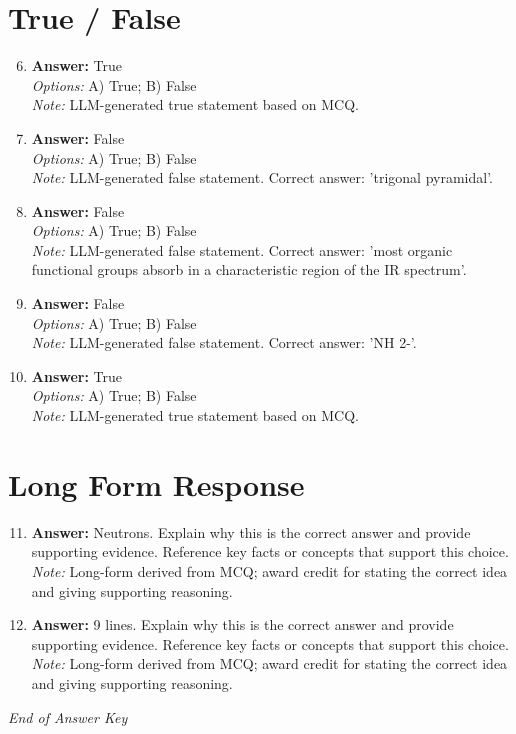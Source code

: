 \documentclass[12pt]{article}
\begin{document}
\section*{True / False}
\begin{enumerate}[label=\arabic*.]
\setcounter{enumi}{5}
\item \textbf{Answer:} True
\\ \textit{Options:} A) True; B) False
\\ \textit{Note:} LLM-generated true statement based on MCQ.
\item \textbf{Answer:} False
\\ \textit{Options:} A) True; B) False
\\ \textit{Note:} LLM-generated false statement. Correct answer: 'trigonal pyramidal'.
\item \textbf{Answer:} False
\\ \textit{Options:} A) True; B) False
\\ \textit{Note:} LLM-generated false statement. Correct answer: 'most organic functional groups absorb in a characteristic region of the IR spectrum'.
\item \textbf{Answer:} False
\\ \textit{Options:} A) True; B) False
\\ \textit{Note:} LLM-generated false statement. Correct answer: 'NH 2-'.
\item \textbf{Answer:} True
\\ \textit{Options:} A) True; B) False
\\ \textit{Note:} LLM-generated true statement based on MCQ.
\end{enumerate}

\section*{Long Form Response}
\begin{enumerate}[label=\arabic*.]
\setcounter{enumi}{10}
\item \textbf{Answer:} Neutrons. Explain why this is the correct answer and provide supporting evidence. Reference key facts or concepts that support this choice.
\\ \textit{Note:} Long-form derived from MCQ; award credit for stating the correct idea and giving supporting reasoning.
\item \textbf{Answer:} 9 lines. Explain why this is the correct answer and provide supporting evidence. Reference key facts or concepts that support this choice.
\\ \textit{Note:} Long-form derived from MCQ; award credit for stating the correct idea and giving supporting reasoning.
\end{enumerate}

\vfill
\noindent\textit{End of Answer Key}
\end{document}
